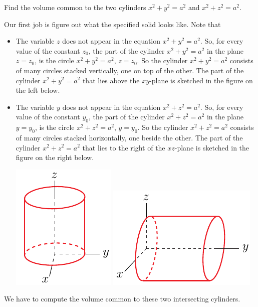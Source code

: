 \begin{eg}[Volume]\label{eg dblInt B}
Find the volume common to the two cylinders $x^2+y^2=a^2$ and
$x^2+z^2=a^2$.

\soln
Our first job is figure out what the specified solid looks like. 
Note that
\begin{itemize}
\item
The variable $z$ does not appear in the equation $x^2+y^2=a^2$.
So, for every value of the constant $z_0$, the part of the cylinder
$x^2+y^2=a^2$ in the plane $z=z_0$, is the circle $x^2+y^2=a^2$, $z=z_0$.
So the cylinder $x^2+y^2=a^2$ consists of many circles stacked
vertically, one on top of the other. The part of the cylinder
$x^2+y^2=a^2$ that lies above the $xy$-plane is sketched in the
figure on the left below.

\item
The variable $y$ does not appear in the equation $x^2+z^2=a^2$.
So, for every value of the constant $y_0$, the part of the cylinder
$x^2+z^2=a^2$ in the plane $y=y_0$, is the circle $x^2+z^2=a^2$, $y=y_0$.
So the cylinder $x^2+z^2=a^2$ consists of many circles stacked
horizontally, one beside the other. The part of the cylinder
$x^2+z^2=a^2$ that lies to the right of the $xz$-plane is sketched in the
figure on the right below.

\begin{efig}
\begin{center}
   \includegraphics{cylinderA.pdf}\qquad
   \includegraphics{cylinderB.pdf}
\end{center}
\end{efig}
\end{itemize}
\noindent
We have to compute the volume common to these two intersecting cylinders.


\end{eg}
